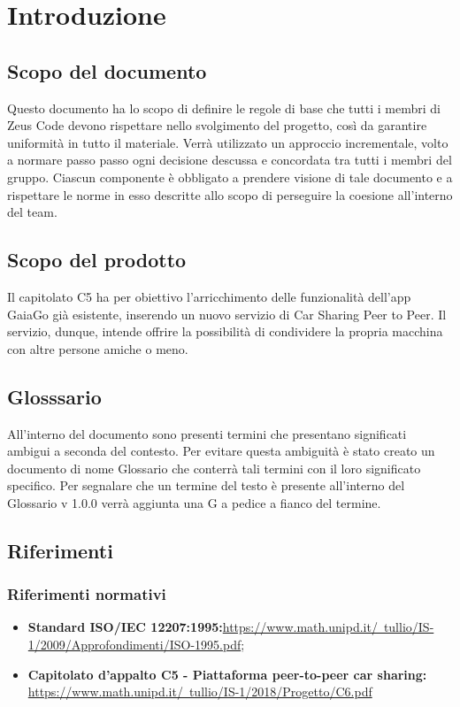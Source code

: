 \section {Introduzione}
\subsection {Scopo del documento}
Questo documento  ha lo scopo di definire le regole di base che tutti i membri di Zeus Code devono rispettare nello svolgimento del progetto, così da garantire uniformità in tutto il materiale. Verrà utilizzato un approccio incrementale, volto a normare passo passo ogni decisione descussa e concordata tra tutti i membri del gruppo. Ciascun componente è obbligato a prendere visione di tale documento e a rispettare le norme in esso descritte allo scopo di perseguire la coesione all'interno del team.
\subsection {Scopo del prodotto}
Il capitolato C5 ha per obiettivo l'arricchimento delle funzionalità dell'app GaiaGo già esistente, inserendo un nuovo servizio di Car Sharing Peer to Peer.
Il servizio, dunque, intende offrire la possibilità di condividere la propria macchina con altre persone amiche o meno.
\subsection {Glosssario}
All’interno del documento sono presenti termini che presentano significati ambigui a seconda del contesto.  Per evitare questa ambiguità è stato creato un documento di nome  Glossario  che  conterrà  tali  termini  con  il  loro  significato  specifico.   Per
segnalare  che  un  termine  del  testo  è  presente  all’interno  del
Glossario  v  1.0.0 verrà aggiunta una G a pedice a fianco del termine.
\subsection {Riferimenti}
\subsubsection {Riferimenti normativi}

\begin{itemize}
	\item  \textbf{Standard ISO/IEC 12207:1995:}\href{https://www.math.unipd.it/~tullio/IS-1/2009/Approfondimenti/ISO_12207-1995.pdf}{https://www.math.unipd.it/~tullio/IS-1/2009/Approfondimenti/ISO-1995.pdf};
	\item \textbf{Capitolato d'appalto C5 - Piattaforma peer-to-peer car sharing:} \href{https://www.math.unipd.it/~tullio/IS- 1/2018/Progetto/C6.pdf}{https://www.math.unipd.it/~tullio/IS-1/2018/Progetto/C6.pdf}
\end{itemize}

